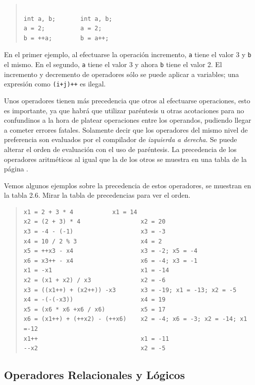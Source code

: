 \begin{quotation}
\begin{verbatim}

int a, b;		int a, b;
a = 2;			a = 2;
b = ++a;		b = a++;

\end{verbatim}
\end{quotation}

En el primer ejemplo, al efectuarse la operaci\'on incremento, \texttt{a} tiene
el valor 3 y \texttt{b} el mismo. En el segundo, \texttt{a} tiene el valor 3
y ahora \texttt{b} tiene el valor 2. El incremento y decremento de operadores
s\'olo se puede aplicar a variables; una expresi\'on como \texttt{(i+j)++}
es ilegal.

Unos operadores tienen m\'as precedencia que otros al efectuarse operaciones,
esto es importante, ya que habr\'a que utilizar par\'entesis u otras 
acotaciones para no confundinos a la hora de platear operaciones entre los 
operandos, pudiendo llegar a cometer errores fatales. Solamente decir que
los operadores del mismo nivel de preferencia son evaluados por el compilador
de \emph{izquierda a derecha}. Se puede alterar el orden de evaluaci\'on con
el uso de par\'entesis.
La precedencia de los operadores aritm\'eticos al igual que la de los otros 
se muestra en una tabla de la p\'agina \pageref{precedencia}.

Vemos algunos ejemplos sobre la precedencia de estos operadores, se 
muestran en la tabla 2.6. Mirar la tabla de precedencias para ver el orden.

\begin{quotation}
\begin{verbatim}
x1 = 2 + 3 * 4			 x1 = 14
x2 = (2 + 3) * 4                 x2 = 20
x3 = -4 - (-1)                   x3 = -3
x4 = 10 / 2 % 3                  x4 = 2
x5 = ++x3 - x4                   x3 = -2; x5 = -4
x6 = x3++ - x4                   x6 = -4; x3 = -1
x1 = -x1                         x1 = -14
x2 = (x1 + x2) / x3              x2 = -6
x3 = ((x1++) + (x2++)) -x3       x3 = -19; x1 = -13; x2 = -5
x4 = -(-(-x3))                   x4 = 19
x5 = (x6 * x6 +x6 / x6)          x5 = 17
x6 = (x1++) + (++x2) - (++x6)    x2 = -4; x6 = -3; x2 = -14; x1 =-12
x1++                             x1 = -11
--x2                             x2 = -5
\end{verbatim}
\end{quotation}

\subsection{Operadores Relacionales y L\'ogicos}


